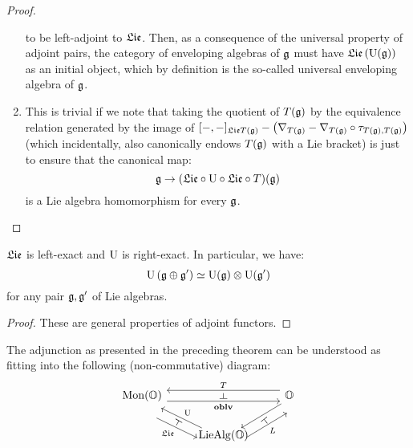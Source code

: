 \begin{proof}
\begin{enumerate}
                            to be left-adjoint to $\mathfrak{Lie}$. Then, as a consequence of the universal property of adjoint pairs, the category of enveloping algebras of $\mathfrak{g}$ must have $\mathfrak{Lie}\left(\mathrm{U}(\mathfrak{g})\right)$ as an initial object, which by definition is the so-called universal enveloping algebra of $\mathfrak{g}$.
                            \item This is trivial if we note that taking the quotient of $T(\mathfrak{g})$ by the equivalence relation generated by the image of $[-,-]_{\mathfrak{Lie} T(\mathfrak{g})} - \left(\nabla_{T(\mathfrak{g})} - \nabla_{T(\mathfrak{g})} \circ \tau_{T(\mathfrak{g}), T(\mathfrak{g})}\right)$ (which incidentally, also canonically endows $T(\mathfrak{g})$ with a Lie bracket) is just to ensure that the canonical map:
                                $$\mathfrak{g} \to (\mathfrak{Lie} \circ \mathrm{U} \circ \mathfrak{Lie} \circ T)(\mathfrak{g})$$
                            is a Lie algebra homomorphism for every $\mathfrak{g}$.
                        \end{enumerate}
                    \end{proof}
                \begin{corollary}
                    $\mathfrak{Lie}$ is left-exact and $\mathrm{U}$ is right-exact. In particular, we have:
                        $$\U\left(\g \oplus \g'\right) \cong \U(\g) \tensor \U(\g')$$
                    for any pair $\mathfrak{g}, \mathfrak{g}'$ of Lie algebras. 
                \end{corollary}
                    \begin{proof}
                        These are general properties of adjoint functors.
                    \end{proof}
                \begin{remark}
                    The adjunction as presented in the preceding theorem can be understood as fitting into the following (non-commutative) diagram:
                        $$
                            \begin{tikzcd}
                            	{\Mon(\O)} & {} & {\O} \\
                            	& {\Lie\Alg(\O)}
                            	\arrow["{\oblv}"{name=0, swap}, from=1-1, to=1-3, shift right=2]
                            	\arrow["{T}"{name=1, swap}, from=1-3, to=1-1, shift right=2]
                            	\arrow["{L}"{name=2, swap}, from=2-2, to=1-3, shift right=5]
                            	\arrow[""{name=3, inner sep=0}, from=1-3, to=2-2, shift left=1]
                            	\arrow["{\U}"{name=4, swap}, from=2-2, to=1-1, shift left=1]
                            	\arrow["{\frakLie}"{name=5, swap}, from=1-1, to=2-2, shift right=5]
                            	\arrow["\dashv"{rotate=-90}, from=1, to=0, phantom]
                            	\arrow["\dashv"{rotate=61}, from=5, to=4, phantom]
                            	\arrow["\dashv"{rotate=129}, from=2, to=3, phantom]
                            \end{tikzcd}
                        $$
                \end{remark}
